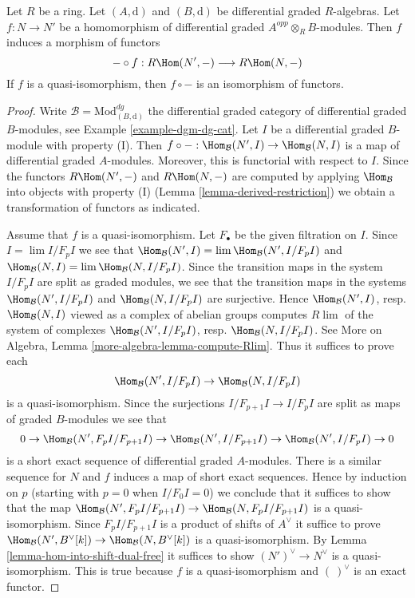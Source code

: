 \begin{lemma}
\label{lemma-functoriality-derived-restriction}
Let $R$ be a ring. Let $(A, \text{d})$ and $(B, \text{d})$ be
differential graded $R$-algebras. Let $f : N \to N'$ be a
homomorphism of differential graded $A^{opp} \otimes_R B$-modules.
Then $f$ induces a morphism of functors
$$
- \circ f : R\Hom(N', -) \longrightarrow R\Hom(N, -)
$$
If $f$ is a quasi-isomorphism, then $f \circ -$ is an isomorphism of
functors.
\end{lemma}

\begin{proof}
Write $\mathcal{B} = \text{Mod}^{dg}_{(B, \text{d})}$ the
differential graded category of differential graded $B$-modules, see
Example \ref{example-dgm-dg-cat}.
Let $I$ be a differential graded $B$-module with property (I).
Then $f \circ - : \Hom_\mathcal{B}(N', I) \to \Hom_\mathcal{B}(N, I)$
is a map of differential graded $A$-modules. Moreover, this is functorial
with respect to $I$. Since the functors
$ R\Hom(N', -)$ and $R\Hom(N, -)$ are
computed by applying $\Hom_\mathcal{B}$ into objects with property (I)
(Lemma \ref{lemma-derived-restriction}) we obtain a transformation of functors
as indicated.

\medskip\noindent
Assume that $f$ is a quasi-isomorphism. Let $F_\bullet$ be the
given filtration on $I$. Since $I = \lim I/F_pI$ we see that
$\Hom_\mathcal{B}(N', I) = \lim \Hom_\mathcal{B}(N', I/F_pI)$ and
$\Hom_\mathcal{B}(N, I) = \lim \Hom_\mathcal{B}(N, I/F_pI)$.
Since the transition maps in the system $I/F_pI$ are split
as graded modules, we see that the transition maps in the
systems $\Hom_\mathcal{B}(N', I/F_pI)$ and $\Hom_\mathcal{B}(N, I/F_pI)$
are surjective. Hence $\Hom_\mathcal{B}(N', I)$, resp. $\Hom_\mathcal{B}(N, I)$
viewed as a complex of abelian groups computes $R\lim$ of the system
of complexes
$\Hom_\mathcal{B}(N', I/F_pI)$, resp. $\Hom_\mathcal{B}(N, I/F_pI)$.
See More on Algebra, Lemma \ref{more-algebra-lemma-compute-Rlim}.
Thus it suffices to prove each
$$
\Hom_\mathcal{B}(N', I/F_pI) \to \Hom_\mathcal{B}(N, I/F_pI)
$$
is a quasi-isomorphism. Since the surjections $I/F_{p + 1}I \to I/F_pI$
are split as maps of graded $B$-modules we see that
$$
0 \to \Hom_\mathcal{B}(N', F_pI/F_{p + 1}I) \to
\Hom_\mathcal{B}(N', I/F_{p + 1}I) \to
\Hom_\mathcal{B}(N', I/F_pI) \to 0
$$
is a short exact sequence of differential graded $A$-modules.
There is a similar sequence for $N$ and $f$ induces a map
of short exact sequences. Hence by induction on $p$ (starting with $p = 0$
when $I/F_0I = 0$) we conclude that it suffices to show that
the map
$\Hom_\mathcal{B}(N', F_pI/F_{p + 1}I) \to \Hom_\mathcal{B}(N, F_pI/F_{p + 1}I)$
is a quasi-isomorphism. Since $F_pI/F_{p + 1}I$ is a product of shifts of
$A^\vee$ it suffice to prove
$\Hom_\mathcal{B}(N', B^\vee[k]) \to \Hom_\mathcal{B}(N, B^\vee[k])$
is a quasi-isomorphism. By Lemma \ref{lemma-hom-into-shift-dual-free}
it suffices to show $(N')^\vee \to N^\vee$ is a quasi-isomorphism.
This is true because $f$ is a quasi-isomorphism and $(\ )^\vee$
is an exact functor.
\end{proof}





